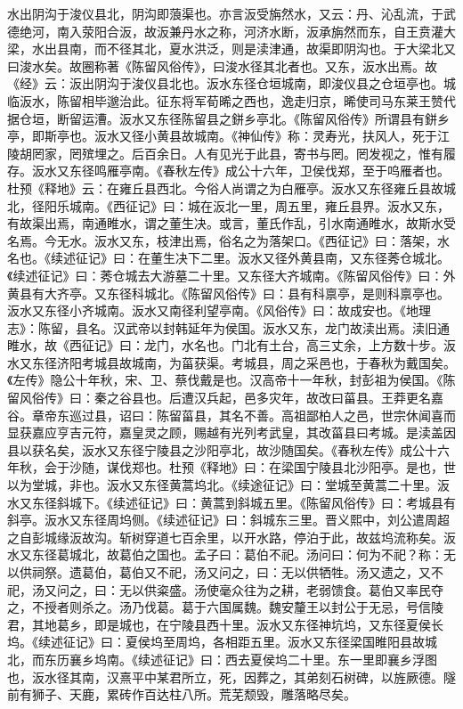 \documentclass[12pt,UTF8]{ctexbook}
\begin{document}
水出阴沟于浚仪县北，阴沟即蒗渠也。亦言汳受旃然水，又云：丹、沁乱流，于武德绝河，南入荥阳合汳，故汳兼丹水之称，河济水断，汳承旃然而东，自王贲灌大梁，水出县南，而不径其北，夏水洪泛，则是渎津通，故渠即阴沟也。于大梁北又曰浚水矣。故圈称著《陈留风俗传》，曰浚水径其北者也。又东，汳水出焉。故《经》云：汳出阴沟于浚仪县北也。汳水东径仓垣城南，即浚仪县之仓垣亭也。城临汳水，陈留相毕邈治此。征东将军荀晞之西也，逸走归京，晞使司马东莱王赞代据仓垣，断留运漕。汳水又东径陈留县之鉼乡亭北。《陈留风俗传》所谓县有鉼乡亭，即斯亭也。汳水又径小黄县故城南。《神仙传》称：灵寿光，扶风人，死于江陵胡罔家，罔殡埋之。后百余日。人有见光于此县，寄书与罔。罔发视之，惟有履存。汳水又东径鸣雁亭南。《春秋左传》成公十六年，卫侯伐郑，至于呜雁者也。杜预《释地》云：在雍丘县西北。今俗人尚谓之为白雁亭。汳水又东径雍丘县故城北，径阳乐城南。《西征记》曰：城在汳北一里，周五里，雍丘县界。汳水又东，有故渠出焉，南通睢水，谓之董生决。或言，董氏作乱，引水南通睢水，故斯水受名焉。今无水。汳水又东，枝津出焉，俗名之为落架口。《西征记》曰：落架，水名也。《续述征记》曰：在董生决下二里。汳水又径外黄县南，又东径莠仓城北。《续述征记》曰：莠仓城去大游墓二十里。又东径大齐城南。《陈留风俗传》曰：外黄县有大齐亭。又东径科城北。《陈留风俗传》曰：县有科禀亭，是则科禀亭也。汳水又东径小齐城南。汳水又南径利望亭南。《风俗传》曰：故成安也。《地理志》：陈留，县名。汉武帝以封韩延年为侯国。汳水又东，龙门故渎出焉。渎旧通睢水，故《西征记》曰：龙门，水名也。门北有土台，高三丈余，上方数十步。汳水又东径济阳考城县故城南，为菑获渠。考城县，周之采邑也，于春秋为戴国矣。《左传》隐公十年秋，宋、卫、蔡伐戴是也。汉高帝十一年秋，封彭祖为侯国。《陈留风俗传》曰：秦之谷县也。后遭汉兵起，邑多灾年，故改曰菑县。王莽更名嘉谷。章帝东巡过县，诏曰：陈留菑县，其名不善。高祖鄙柏人之邑，世宗休闻喜而显获嘉应亨吉元符，嘉皇灵之顾，赐越有光列考武皇，其改菑县曰考城。是渎盖因县以获名矣，汳水又东径宁陵县之沙阳亭北，故沙随国矣。《春秋左传》成公十六年秋，会于沙随，谋伐郑也。杜预《释地》曰：在梁国宁陵县北沙阳亭。是也，世以为堂城，非也。汳水又东径黄蒿坞北。《续途征记》曰：堂城至黄蒿二十里。汳水又东径斜城下。《续述征记》曰：黄蒿到斜城五里。《陈留风俗传》曰：考城县有斜亭。汳水又东径周坞侧。《续述征记》曰：斜城东三里。晋义熙中，刘公遣周超之自彭城缘汳故沟。斩树穿道七百余里，以开水路，停泊于此，故兹坞流称矣。汳水又东径葛城北，故葛伯之国也。孟子曰：葛伯不祀。汤问曰：何为不祀？称：无以供祠祭。遗葛伯，葛伯又不祀，汤又问之，曰：无以供牺牲。汤又遗之，又不祀，汤又问之，曰：无以供粢盛。汤使毫众往为之耕，老弱馈食。葛伯又率民夺之，不授者则杀之。汤乃伐葛。葛于六国属魏。魏安釐王以封公于无忌，号信陵君，其地葛乡，即是城也，在宁陵县西十里。汳水又东径神坑坞，又东径夏侯长坞。《续述征记》曰：夏侯坞至周坞，各相距五里。汳水又东径梁国睢阳县故城北，而东历襄乡坞南。《续述征记》曰：西去夏侯坞二十里。东一里即襄乡浮图也，汳水径其南，汉熹平中某君所立，死，因葬之，其弟刻石树碑，以旌厥德。隧前有狮子、天鹿，累砖作百达柱八所。荒芜颓毁，雕落略尽矣。
\end{document}

